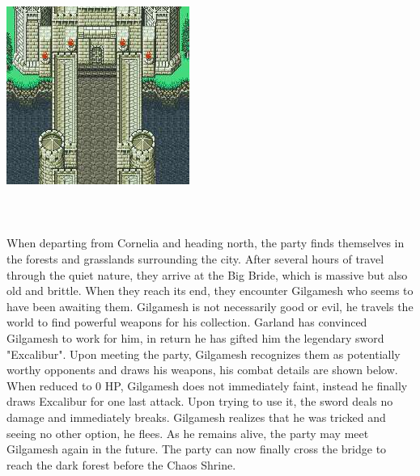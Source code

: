 \includegraphics[width=\columnwidth]{./art/chaosincornelia/bridge.jpg} 
%
\\\\
%
\\\\
%
When departing from Cornelia and heading north, the party finds themselves in the forests and grasslands surrounding the city.
After several hours of travel through the quiet nature, they arrive at the Big Bride, which is massive but also old and brittle.
When they reach its end, they encounter Gilgamesh who seems to have been awaiting them.
Gilgamesh is not necessarily good or evil, he travels the world to find powerful weapons for his collection.
Garland has convinced Gilgamesh to work for him, in return he has gifted him the legendary sword "Excalibur".
Upon meeting the party, Gilgamesh recognizes them as potentially worthy opponents and draws his weapons, his combat details are shown below.
When reduced to 0 HP, Gilgamesh does not immediately faint, instead he finally draws Excalibur for one last attack.
Upon trying to use it, the sword deals no damage and immediately breaks.
Gilgamesh realizes that he was tricked and seeing no other option, he flees. 
As he remains alive, the party may meet Gilgamesh again in the future.
The party can now finally cross the bridge to reach the dark forest before the Chaos Shrine.

